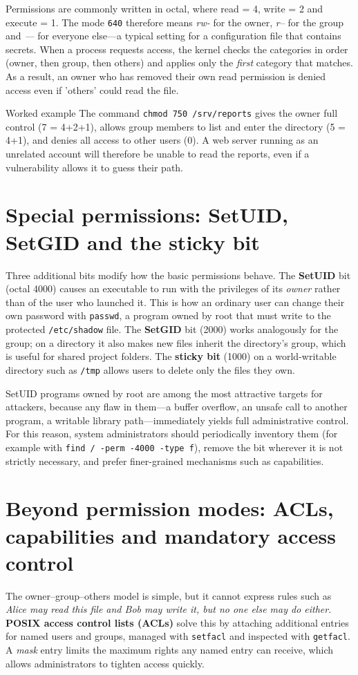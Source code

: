 \documentclass[11pt,openany]{book}
\begin{document}
Permissions are commonly written in octal, where read = 4, write = 2 and execute = 1. The mode \texttt{640} therefore means \emph{rw-} for the owner, \emph{r--} for the group and \emph{---} for everyone else—a typical setting for a configuration file that contains secrets. When a process requests access, the kernel checks the categories in order (owner, then group, then others) and applies only the \emph{first} category that matches. As a result, an owner who has removed their own read permission is denied access even if 'others' could read the file.

\begin{examplebox}{Worked example}
The command \texttt{chmod 750 /srv/reports} gives the owner full control (7 = 4+2+1), allows group members to list and enter the directory (5 = 4+1), and denies all access to other users (0). A web server running as an unrelated account will therefore be unable to read the reports, even if a vulnerability allows it to guess their path.
\end{examplebox}

\section{Special permissions: SetUID, SetGID and the sticky bit}\label{sec:2.2}
Three additional bits modify how the basic permissions behave. The \textbf{SetUID} bit (octal 4000) causes an executable to run with the privileges of its \emph{owner} rather than of the user who launched it. This is how an ordinary user can change their own password with \texttt{passwd}, a program owned by root that must write to the protected \texttt{/etc/shadow} file. The \textbf{SetGID} bit (2000) works analogously for the group; on a directory it also makes new files inherit the directory's group, which is useful for shared project folders. The \textbf{sticky bit} (1000) on a world-writable directory such as \texttt{/tmp} allows users to delete only the files they own.

SetUID programs owned by root are among the most attractive targets for attackers, because any flaw in them—a buffer overflow, an unsafe call to another program, a writable library path—immediately yields full administrative control. For this reason, system administrators should periodically inventory them (for example with \texttt{find / -perm -4000 -type f}), remove the bit wherever it is not strictly necessary, and prefer finer-grained mechanisms such as capabilities.

\section{Beyond permission modes: ACLs, capabilities and mandatory access control}\label{sec:2.3}
The owner–group–others model is simple, but it cannot express rules such as \emph{Alice may read this file and Bob may write it, but no one else may do either}. \textbf{POSIX access control lists (ACLs)} solve this by attaching additional entries for named users and groups, managed with \texttt{setfacl} and inspected with \texttt{getfacl}. A \emph{mask} entry limits the maximum rights any named entry can receive, which allows administrators to tighten access quickly.
\end{document}
